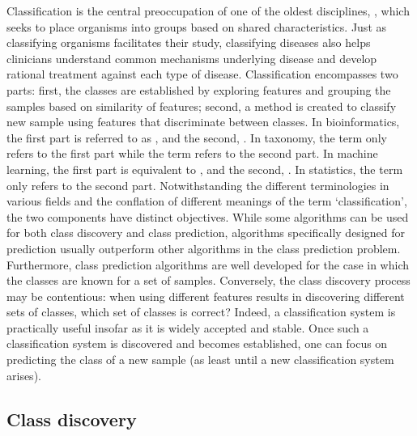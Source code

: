 Classification is the central preoccupation of one of the oldest disciplines, , which seeks to place organisms into groups based on shared characteristics. Just as classifying organisms facilitates their study, classifying diseases also helps clinicians understand common mechanisms underlying disease and develop rational treatment against each type of disease. Classification encompasses two parts: first, the classes are established by exploring features and grouping the samples based on similarity of features; second, a method is created to classify new sample using features that discriminate between classes. In bioinformatics, the first part is referred to as , and the second, . In taxonomy, the term  only refers to the first part while the term  refers to the second part. In machine learning, the first part is equivalent to , and the second, . In statistics, the term  only refers to the second part. Notwithstanding the different terminologies in various fields and the conflation of different meanings of the term `classification', the two components have distinct objectives. While some algorithms can be used for both class discovery and class prediction, algorithms specifically designed for prediction usually outperform other algorithms in the class prediction problem. Furthermore, class prediction algorithms are well developed for the case in which the classes are known for a set of samples. Conversely, the class discovery process may be contentious: when using different features results in discovering different sets of classes, which set of classes is correct? Indeed, a classification system is practically useful insofar as it is widely accepted and stable. Once such a classification system is discovered and becomes established, one can focus on predicting the class of a new sample (as least until a new classification system arises).

\subsection{Class discovery}

